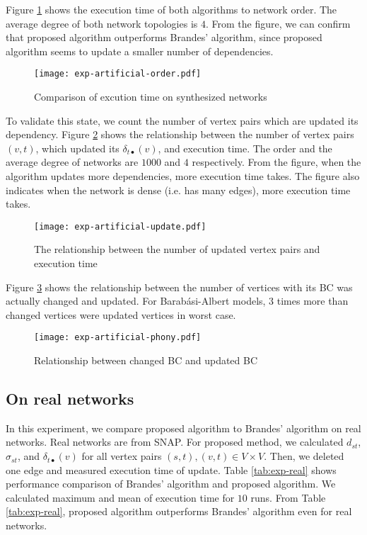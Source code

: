\documentclass{article}
\begin{document}
Figure \ref{fig:exp-artificial-order} shows the execution time of both algorithms to network order.
The average degree of both network topologies is $4$.
From the figure, we can confirm that proposed algorithm outperforms Brandes' algorithm, since proposed algorithm seems to update a smaller number of dependencies.

\begin{figure}
  \centering
  \texttt{[image: exp-artificial-order.pdf]}
  \caption{Comparison of excution time on synthesized networks}
  \label{fig:exp-artificial-order}
\end{figure}

To validate this state, we count the number of vertex pairs which are updated its dependency.
Figure \ref{fig:exp-artificial-update} shows the relationship between the number of vertex pairs $(v,t)$, which updated its $\delta_{t\bullet}(v)$, and execution time.
The order and the average degree of networks are $1000$ and $4$ respectively.
From the figure, when the algorithm updates more dependencies, more execution time takes.
The figure also indicates when the network is dense (i.e. has many edges), more execution time takes.

\begin{figure}
  \centering
  \texttt{[image: exp-artificial-update.pdf]}
  \caption{The relationship between the number of updated vertex pairs and execution time}
  \label{fig:exp-artificial-update}
\end{figure}

Figure \ref{fig:exp-artificial-phony} shows the relationship between the number of vertices with its BC was actually changed and updated.
For Barab{\'{a}}si-Albert models, $3$ times more than changed vertices were updated vertices in worst case.

\begin{figure}
  \centering
  \texttt{[image: exp-artificial-phony.pdf]}
  \caption{Relationship between changed BC and updated BC}
  \label{fig:exp-artificial-phony}
\end{figure}

\subsection*{On real networks}
In this experiment, we compare proposed algorithm to Brandes' algorithm on real networks.
Real networks are from SNAP\cite{Leskovec2016}.
For proposed method, we calculated $d_{st}$, $\sigma_{st}$, and $\delta_{t\bullet}(v)$ for all vertex pairs $(s,t),(v,t)\in V\times V$.
Then, we deleted one edge and measured execution time of update.
Table \ref{tab:exp-real} shows performance comparison of Brandes' algorithm and proposed algorithm.
We calculated maximum and mean of execution time for $10$ runs.
From Table \ref{tab:exp-real}, proposed algorithm outperforms Brandes' algorithm even for real networks.
\end{document}
